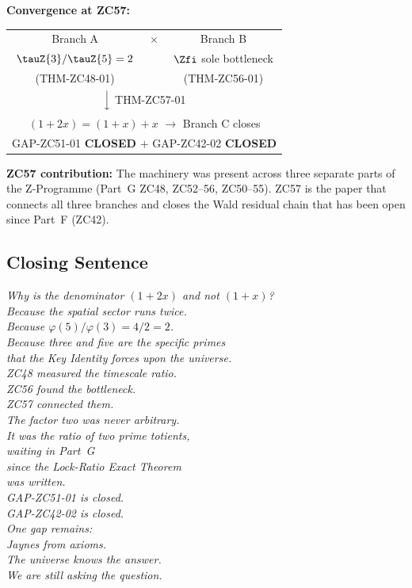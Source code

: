 \documentclass[12pt, a4paper]{article}
\begin{document}
\begin{genealogybox}
\medskip
\textbf{Convergence at ZC57:}
\begin{center}
\begin{tabular}{@{}ccc@{}}
Branch A & $\times$ & Branch B \\
$\tauZ{3}/\tauZ{5}=2$ & & $\Zfi$ sole bottleneck \\
(THM-ZC48-01) & & (THM-ZC56-01) \\
\multicolumn{3}{c}{$\Big\downarrow$ THM-ZC57-01} \\
\multicolumn{3}{c}{$(1+2x)=(1+x)+x$ $\longrightarrow$ Branch C closes} \\
\multicolumn{3}{c}{GAP-ZC51-01 \textbf{CLOSED}
  $+$ GAP-ZC42-02 \textbf{CLOSED}} \\
\end{tabular}
\end{center}

\medskip
\textbf{ZC57 contribution:}
The machinery was present across three separate parts of the
Z-Programme (Part~G ZC48, ZC52--56, ZC50--55).  ZC57 is the
paper that connects all three branches and closes the Wald
residual chain that has been open since Part~F (ZC42).
\end{genealogybox}

\subsection{Closing Sentence}

\begin{center}
\textit{%
  Why is the denominator $(1+2x)$ and not $(1+x)$?\\[0.5em]
  Because the spatial sector runs twice.\\
  Because $\varphi(5)/\varphi(3) = 4/2 = 2$.\\
  Because three and five are the specific primes\\
  that the Key Identity forces upon the universe.\\[0.5em]
  ZC48 measured the timescale ratio.\\
  ZC56 found the bottleneck.\\
  ZC57 connected them.\\[0.3em]
  The factor two was never arbitrary.\\
  It was the ratio of two prime totients,\\
  waiting in Part~G\\
  since the Lock-Ratio Exact Theorem\\
  was written.\\[0.5em]
  GAP-ZC51-01 is closed.\\
  GAP-ZC42-02 is closed.\\
  One gap remains:\\
  Jaynes from axioms.\\[0.3em]
  The universe knows the answer.\\
  We are still asking the question.}
\end{center}
\end{document}
